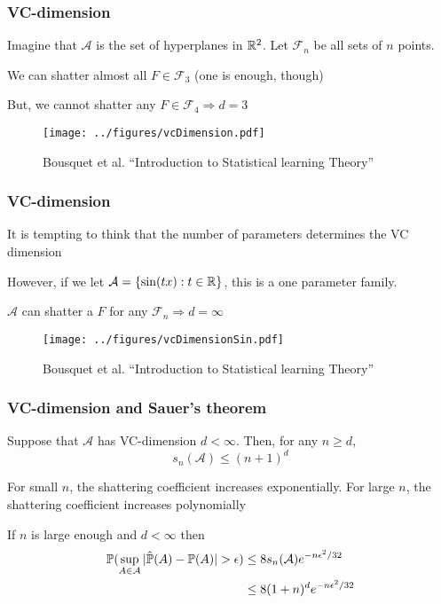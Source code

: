 \documentclass[12pt]{beamer}
\begin{document}
\begin{frame}[fragile]
\frametitle{VC-dimension}
Imagine that $\mathcal{A}$ is the set of hyperplanes in $\R^2$.  Let $\mathcal{F}_n$ be all sets of $n$ points.

\vsp
We can shatter almost all $F \in \mathcal{F}_3$ (one is enough, though)

\vsp
But, we cannot shatter any $F \in \mathcal{F}_4 \Rightarrow d = 3$ 
\begin{figure}
\centering
\texttt{[image: ../figures/vcDimension.pdf]}
\caption*{Bousquet et al. ``Introduction to Statistical learning Theory''}
\end{figure}
\end{frame}
\begin{frame}[fragile]
\frametitle{VC-dimension}
It is tempting to think that the number of parameters determines the VC dimension
\vsp

However, if we let $\mathcal{A} = \{\sin(tx): t \in \R\}$, this is a one parameter family.

\vsp 
$\mathcal{A}$ can shatter a $F$ for any $\mathcal{F}_n \Rightarrow d = \infty$
\begin{figure}
\centering
\texttt{[image: ../figures/vcDimensionSin.pdf]}
\caption*{Bousquet et al. ``Introduction to Statistical learning Theory''}
\end{figure}
\end{frame}

\begin{frame}[fragile]
\frametitle{VC-dimension and Sauer's theorem}
Suppose that $\mathcal{A}$ has VC-dimension $d < \infty$.  Then, for any $n \geq d$,
\[
s_n(\mathcal{A}) \leq (n + 1)^d
\]

 For small $n$, the shattering coefficient increases exponentially.
For large $n$, the shattering coefficient increases polynomially 

\vsp
If $n$ is large enough and $d < \infty$ then 
\begin{align*}
\P(\sup_{A \in \mathcal{A}} |\hat{\P}(A) - \P(A)| > \epsilon) 
& \leq 
8 s_n(\mathcal{A}) e^{-n\epsilon^2/32} \\
& \leq 
8(1+n)^d e^{-n\epsilon^2/32} \\
\end{align*}
\end{frame}

\end{document}
